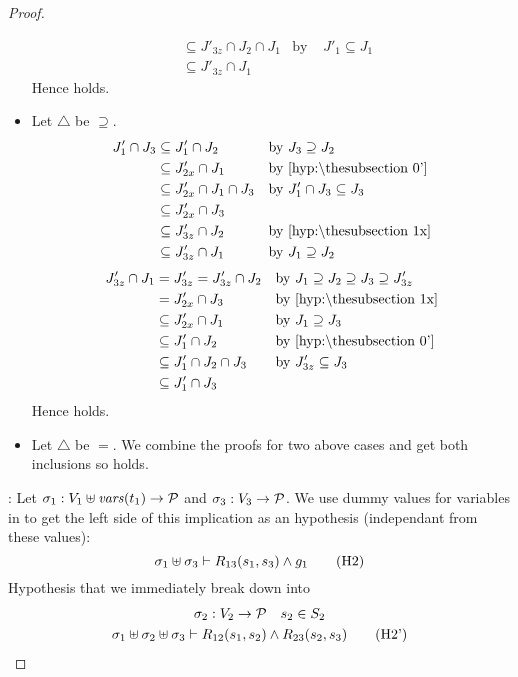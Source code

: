 \documentclass{article}
\begin{document}
\begin{proof}
\begin{itemize}
\begin{align*}
		& \subseteq J'_{3z} \cap J_2 \cap J_1 & \text{by } & J'_1 \subseteq J_1 \\
		& \subseteq J'_{3z} \cap J_1 &&
	\end{align*}
	Hence  holds.
\item Let \(\triangle\) be \(\supseteq\).
	\begin{align*}
	J'_1 \cap J_3 & \subseteq J'_1 \cap J_2 & \text{by } & J_3 \supseteq J_2 \\
		& \subseteq J'_{2x} \cap J_1 & \text{by } & \text{\hyp{0'}} \\
		& \subseteq J'_{2x} \cap J_1 \cap J_3 & \text{by } & J'_1 \cap J_3 \subseteq J_3 \\
		& \subseteq J'_{2x} \cap J_3 && \\
		& \subseteq J'_{3z} \cap J_2 & \text{by } & \text{\hyp{1x}} \\
		& \subseteq J'_{3z} \cap J_1 & \text{by } & J_1 \supseteq J_2
	\end{align*}
	\begin{align*}
	J'_{3z} \cap J_1 & = J'_{3z} = J'_{3z} \cap J_2 & \text{by } & J_1 \supseteq J_2 \supseteq J_3 \supseteq J'_{3z} \\
		& = J'_{2x} \cap J_3 & \text{by } & \text{\hyp{1x}} \\
		& \subseteq J'_{2x} \cap J_1 & \text{by } & J_1 \supseteq J_3 \\
		& \subseteq J'_1 \cap J_2 & \text{by } & \text{\hyp{0'}} \\
		& \subseteq J'_1 \cap J_2 \cap J_3 & \text{by } & J'_{3z} \subseteq J_3 \\
		& \subseteq J'_1 \cap J_3 &&
	\end{align*}
	Hence  holds.
\item Let \(\triangle\) be \(=\).
	We combine the proofs for two above cases and get both inclusions so  holds.
\end{itemize}
\item[\goal{3}:] Let \(\sigma_1: V_1 \uplus \mathit{vars}{\left(t_1\right)} \to \mathcal{P}\) and \(\sigma_3: V_3 \to \mathcal{P}\).
We use dummy values for variables in  to get the left side of this implication as an hypothesis (independant from these values):
\[ \sigma_1 \uplus \sigma_3 \vdash R_{13}\mpar{s_1, s_3} \wedge g_1 \hyp{2} \]
Hypothesis that we immediately break down into
\begin{gather*}
	\sigma_2: V_2 \to \values \quad s_2 \in S_2 \\
	\sigma_1 \uplus \sigma_2 \uplus \sigma_3 \vdash R_{12}\mpar{s_1, s_2} \wedge R_{23}\mpar{s_2, s_3} \hyp{2'} \\

\end{gather*}
\end{proof}
\end{document}

